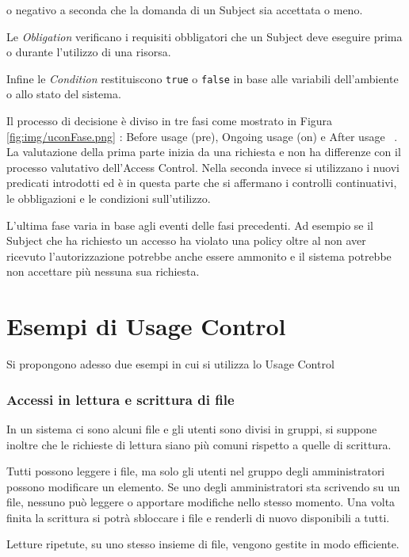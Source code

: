 o negativo a seconda che la domanda di un Subject sia accettata o meno.\par
Le \emph{Obligation} verificano i requisiti obbligatori che un Subject deve eseguire prima o durante l'utilizzo di una risorsa.\par
Infine le \emph{Condition} restituiscono \texttt{true} o \texttt{false} in base alle variabili dell'ambiente o allo stato del sistema.\par
Il processo di decisione è diviso in tre fasi come mostrato in Figura \ref{fig:img/uconFase.png} : Before usage (pre), Ongoing usage (on) e After usage ~\cite{SurveyUsageControl}.
\\
La valutazione della prima parte inizia da una richiesta e non ha differenze con il processo valutativo dell'Access Control.
Nella seconda invece si utilizzano i nuovi predicati introdotti ed è in questa parte che si affermano i controlli continuativi,
le obbligazioni e le condizioni sull'utilizzo.\par
L'ultima fase varia in base agli eventi delle fasi precedenti. Ad esempio se il Subject che ha richiesto un accesso ha violato
una policy oltre al non aver ricevuto l'autorizzazione potrebbe anche essere ammonito e il sistema potrebbe non accettare più
nessuna sua richiesta.

\section{Esempi di Usage Control}
\label{subs:es_UC}
Si propongono adesso due esempi in cui si utilizza lo Usage Control
\subsubsection*{Accessi in lettura e scrittura di file}
\label{subs:Accessi in lettura e scrittura di file}
In un sistema ci sono alcuni file e gli utenti sono divisi in gruppi, si suppone inoltre che le richieste di lettura
siano più comuni rispetto a quelle di scrittura.\par Tutti possono leggere i file, ma solo
gli utenti nel gruppo degli amministratori possono modificare un elemento. Se uno degli amministratori sta scrivendo
su un file, nessuno può leggere o apportare modifiche nello stesso momento. Una volta finita la scrittura si potrà sbloccare
i file e renderli di nuovo disponibili a tutti.\par
Letture ripetute, su uno stesso insieme di file, vengono gestite in modo efficiente.
